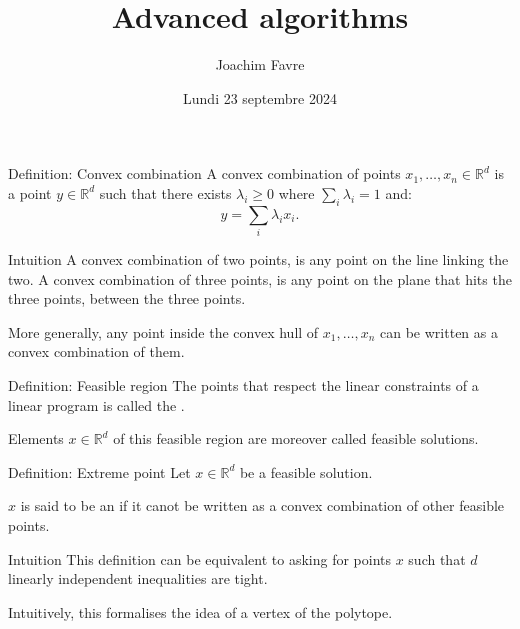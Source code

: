 \documentclass[a4paper]{article}
\title{Advanced algorithms}
\author{Joachim Favre}
\date{Lundi 23 septembre 2024}
\begin{document}
\maketitle


\begin{parag}{Definition: Convex combination}
    A convex combination of points $x_1, \ldots, x_n \in \mathbb{R}^d$ is a point $y \in \mathbb{R}^d$ such that there exists $\lambda_i \geq 0$ where $\sum_{i} \lambda_i = 1$ and:
    \[y = \sum_{i} \lambda_i x_i.\]

    \begin{subparag}{Intuition}
        A convex combination of two points, is any point on the line linking the two. A convex combination of three points, is any point on the plane that hits the three points, between the three points.

        More generally, any point inside the convex hull of $x_1, \ldots, x_n$ can be written as a convex combination of them.
    \end{subparag}
\end{parag}

\begin{parag}{Definition: Feasible region}
    The points that respect the linear constraints of a linear program is called the .

    Elements $x \in \mathbb{R}^d$ of this feasible region are moreover called feasible solutions.
\end{parag}

\begin{parag}{Definition: Extreme point}
    Let $x \in \mathbb{R}^d$ be a feasible solution.

    $x$ is said to be an  if it canot be written as a convex combination of other feasible points.
    
    \begin{subparag}{Intuition}
        This definition can be equivalent to asking for points $x$ such that $d$ linearly independent inequalities are tight.

        Intuitively, this formalises the idea of a vertex of the polytope.
    \end{subparag}
\end{parag}
\end{document}
